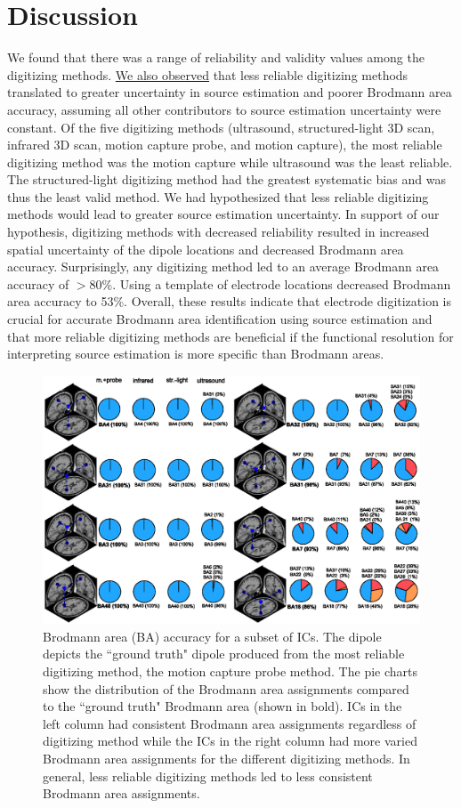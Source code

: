 \documentclass[../thesis_seyed.tex]{subfiles}
\begin{document}
\section{Discussion}

We found that there was a range of reliability and validity values among the digitizing methods. \ul{We also observed} that less reliable digitizing methods translated to greater uncertainty in source estimation and poorer Brodmann area accuracy, assuming all other contributors to source estimation uncertainty were constant. Of the five digitizing methods (ultrasound, structured-light 3D scan, infrared 3D scan, motion capture probe, and motion capture), the most reliable digitizing method was the motion capture while ultrasound was the least reliable. The structured-light digitizing method had the greatest systematic bias and was thus the least valid method. We had hypothesized that less reliable digitizing methods would lead to greater source estimation uncertainty. In support of our hypothesis, digitizing methods with decreased reliability resulted in increased spatial uncertainty of the dipole locations and decreased Brodmann area accuracy. Surprisingly, any digitizing method led to an average Brodmann area accuracy of $>$80\%. Using a template of electrode locations decreased Brodmann area accuracy to 53\%. Overall, these results indicate that electrode digitization is crucial for accurate Brodmann area identification using source estimation and that more reliable digitizing methods are beneficial if the functional resolution for interpreting source estimation is more specific than Brodmann areas.

\begin{figure}[!h]
    \centering
    \includegraphics[width=\linewidth]{../img/result6.eps}
    \caption{Brodmann area (BA) accuracy for a subset of ICs. The dipole depicts the ``ground truth" dipole produced from the most reliable digitizing method, the motion capture probe method. The pie charts show the distribution of the Brodmann area assignments compared to the ``ground truth" Brodmann area (shown in bold). ICs in the left column had consistent Brodmann area assignments regardless of digitizing method while the ICs in the right column had more varied Brodmann area assignments for the different digitizing methods. In general, less reliable digitizing methods led to less consistent Brodmann area assignments.}
    \label{fig:r6}
\end{figure}
\end{document}
